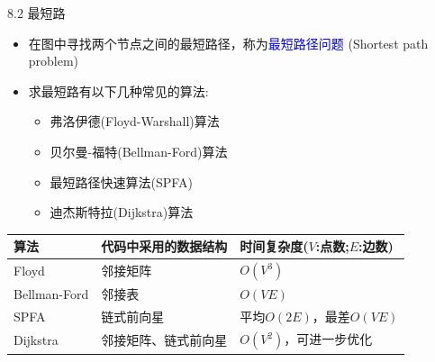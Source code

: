 \begin{frame}{8.2 最短路}
    \begin{itemize}
        \item 在图中寻找两个节点之间的最短路径，称为\textcolor{blue}{最短路径问题} (Shortest path problem)
        \item 求最短路有以下几种常见的算法:
        \begin{itemize}
            \item 弗洛伊德(Floyd-Warshall)算法
            \item 贝尔曼-福特(Bellman-Ford)算法
            \item 最短路径快速算法(SPFA)
            \item 迪杰斯特拉(Dijkstra)算法
        \end{itemize}
    \end{itemize}
    \begin{table}
        \scriptsize{
        \begin{tabular}{l|l|l}
            \textbf{算法} & \textbf{代码中采用的数据结构} & \textbf{时间复杂度($V$:点数;$E$:边数)}\\\hline
			Floyd        & 邻接矩阵                 & $O(V^3)$    \\\hline
			Bellman-Ford & 邻接表                   & $O(VE)$     \\\hline
			SPFA         & 链式前向星               & 平均$O(2E)$，最差$O(VE)$  \\\hline
			Dijkstra     & 邻接矩阵、链式前向星     & $O(V^2)$，可进一步优化   \\\hline
        \end{tabular}}
    \end{table}
\end{frame}
